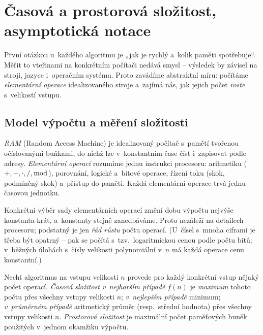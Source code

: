 \documentclass[11pt,a4paper]{article}
\begin{document}
\section{Časová a prostorová složitost, asymptotická notace}

První otázkou u~každého algoritmu je „jak je rychlý a~kolik paměti spotřebuje``. Měřit to vteřinami na konkrétním počítači nedává smysl -- výsledek by závisel na stroji, jazyce i~operačním systému. Proto zavádíme abstraktní míru: počítáme \emph{elementární operace} idealizovaného stroje a~zajímá nás, jak jejich počet \emph{roste} s~velikostí vstupu.

\subsection{Model výpočtu a měření složitosti}

\begin{definice}
\emph{RAM} (Random Access Machine) je idealizovaný počítač s~pamětí tvořenou očíslovanými buňkami, do nichž lze v~konstantním čase číst i~zapisovat podle adresy. \emph{Elementární operací} rozumíme jednu instrukci procesoru: aritmetiku ($+,-,\cdot,/,\bmod$), porovnání, logické a~bitové operace, řízení toku (skok, podmíněný skok) a~přístup do paměti. Každá elementární operace trvá jednu časovou jednotku.
\end{definice}

\begin{intuice}
Konkrétní výběr sady elementárních operací změní dobu výpočtu nejvýše konstanta-krát, a~konstanty stejně zanedbáváme. Proto nezáleží na detailech procesoru; podstatný je jen \emph{řád růstu} počtu operací. (U~čísel s~mnoha ciframi je třeba být opatrný -- pak se počítá s~tzv.\ logaritmickou cenou podle počtu bitů; v~běžných úlohách s~čísly velikosti polynomiální v~$n$ má každá operace cenu konstantní.)
\end{intuice}

\begin{definice}
Nechť algoritmus na vstupu velikosti $n$ provede pro každý konkrétní vstup nějaký počet operací. \emph{Časová složitost v~nejhorším případě} $f(n)$ je \emph{maximum} tohoto počtu přes všechny vstupy velikosti $n$; \emph{v~nejlepším případě} minimum; \emph{v~průměrném případě} aritmetický průměr (resp.\ střední hodnota) přes všechny vstupy velikosti $n$. \emph{Prostorová složitost} je maximální počet paměťových buněk použitých v~jednom okamžiku výpočtu.
\end{definice}
\end{document}
